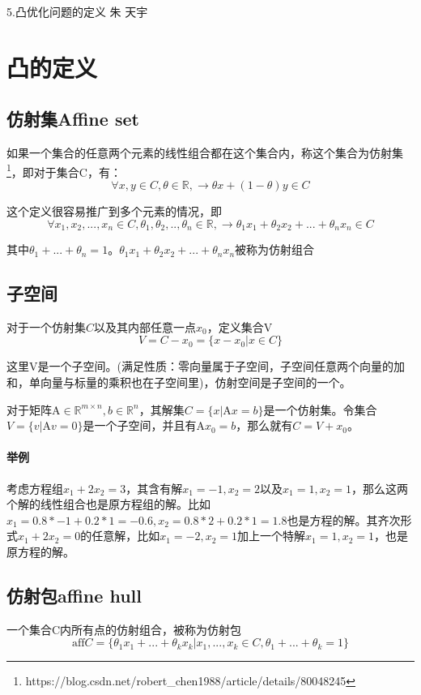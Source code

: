 \documentclass[a4paper]{D:/MyRepo/Script/latex/PaperReadingLog}
\begin{document}
\PaperInfo
{5.凸优化问题的定义}
{朱}
{天宇}
{}

\section{凸的定义}
\subsection{仿射集Affine set}
如果一个集合的任意两个元素的线性组合都在这个集合内，称这个集合为仿射集\footnote{https://blog.csdn.net/robert\_chen1988/article/details/80048245}，即对于集合C，有：
$$
\forall x,y\in C,\theta\in\mathbb{R}, \rightarrow \theta x+(1-\theta) y\in C
$$

这个定义很容易推广到多个元素的情况，即
$$
\forall x_1,x_2,...,x_n\in C,\theta_1,\theta_2,..,\theta_n\in\mathbb{R},\rightarrow \theta_1 x_1+\theta_2 x_2+...+\theta_n x_n\in C
$$

其中$\theta_1+...+\theta_n=1$。$\theta_1 x_1+\theta_2 x_2+...+\theta_n x_n$被称为仿射组合

\subsection{子空间}
对于一个仿射集$ C$以及其内部任意一点$x_0$，定义集合$\mathrm{V}$
$$
V= C-x_0=\{x-x_0|x\in C\}
$$

这里$\mathrm{V}$是一个子空间。(满足性质：零向量属于子空间，子空间任意两个向量的加和，单向量与标量的乘积也在子空间里)，仿射空间是子空间的一个。

对于矩阵$\mathrm{A}\in\mathbb{R}^{m\times n},b\in\mathbb{R}^n$，其解集$C=\{x|\mathrm{A}x=b\}$是一个仿射集。令集合$V=\{v|\mathrm{A}v=0\}$是一个子空间，并且有$\mathrm{A}x_0=b$，那么就有$C=V+x_0$。

\paragraph{举例}
考虑方程组$x_1+2x_2=3$，其含有解$x_1=-1,x_2=2$以及$x_1=1,x_2=1$，那么这两个解的线性组合也是原方程组的解。比如$x_1=0.8*-1+0.2*1=-0.6,x_2=0.8*2+0.2*1=1.8$也是方程的解。其齐次形式$x_1+2x_2=0$的任意解，比如$x_1=-2,x_2=1$加上一个特解$x_1=1,x_2=1$，也是原方程的解。

\subsection{仿射包affine hull}
一个集合C内所有点的仿射组合，被称为仿射包
$$
\mathrm{aff}C=\{\theta_1x_1+...+\theta_kx_k|x_1,...,x_k\in C,\theta_1+...+\theta_k=1\}
$$
\end{document}
